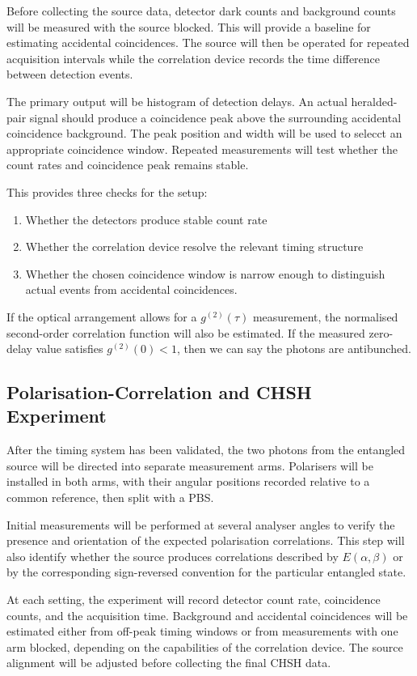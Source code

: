 \documentclass{article}
\begin{document}
Before collecting the source data, detector dark counts and background counts will be measured with the source blocked. This will provide a baseline for estimating accidental coincidences. The source will then be operated for repeated acquisition intervals while the correlation device records the time difference between detection events.

The primary output will be histogram of detection delays. An actual heralded-pair signal should produce a coincidence peak above the surrounding accidental coincidence background. The peak position and width will be used to selecct an appropriate coincidence window. Repeated measurements will test whether the count rates and coincidence peak remains stable.

This provides three checks for the setup:
\begin{enumerate}
    \item Whether the detectors produce stable count rate
    \item Whether the correlation device resolve the relevant timing structure
    \item Whether the chosen coincidence window is narrow enough to distinguish actual events from accidental coincidences.
\end{enumerate}

If the optical arrangement allows for a $g^{(2)}(\tau )$ measurement, the normalised second-order correlation function will also be estimated. If the measured zero-delay value satisfies $g^{(2)}(0)<1$, then we can say the photons are antibunched.

\subsection{Polarisation-Correlation and CHSH Experiment}
After the timing system has been validated, the two photons from the entangled source will be directed into separate measurement arms. Polarisers will be installed in both arms, with their angular positions recorded relative to a common reference, then split with a PBS.

Initial measurements will be performed at several analyser angles to verify the presence and orientation of the expected polarisation correlations. This step will also identify whether the source produces correlations described by $E(\alpha ,\beta )$ or by the corresponding sign-reversed convention for the particular entangled state.

At each setting, the experiment will record detector count rate, coincidence counts, and the acquisition time. Background and accidental coincidences will be estimated either from off-peak timing windows or from measurements with one arm blocked, depending on the capabilities of the correlation device. The source alignment will be adjusted before collecting the final CHSH data.
\end{document}
